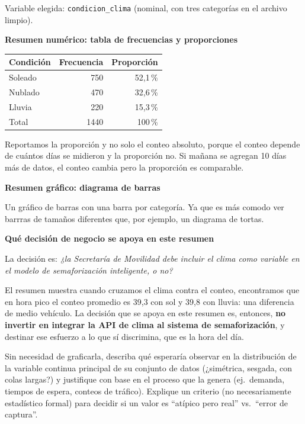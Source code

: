 \documentclass[11pt]{article}
\begin{document}
\begin{respuesta}[Respuesta 1.3]
Variable elegida: \texttt{condicion\_clima} (nominal, con tres categorías en el archivo limpio).

\medskip
\noindent\textbf{Resumen numérico: tabla de frecuencias y proporciones}

\begin{center}
\begin{tabular}{lrr}
\toprule
Condición & Frecuencia & Proporción \\
\midrule
Soleado & 750 & 52,1\,\% \\
Nublado & 470 & 32,6\,\% \\
Lluvia  & 220 & 15,3\,\% \\
\midrule
Total & 1440 & 100\,\% \\
\bottomrule
\end{tabular}
\end{center}

Reportamos la proporción y no solo el conteo absoluto, porque el conteo depende de cuántos días se midieron y la proporción no. Si mañana se agregan 10 días más de datos, el conteo cambia pero la proporción es comparable.

\medskip
\noindent\textbf{Resumen gráfico: diagrama de barras}

Un gráfico de barras con una barra por categoría. Ya que es más comodo ver barrras de tamaños diferentes que, por ejemplo, un diagrama de tortas.

\medskip
\noindent\textbf{Qué decisión de negocio se apoya en este resumen}

La decisión es: \emph{¿la Secretaría de Movilidad debe incluir el clima como variable en el modelo de semaforización inteligente, o no?}

El resumen muestra cuando cruzamos el clima contra el conteo, encontramos que en hora pico el conteo promedio es 39,3 con sol y 39,8 con lluvia: una diferencia de medio vehículo. La decisión que se apoya en este resumen es, entonces, \textbf{no invertir en integrar la API de clima al sistema de semaforización}, y destinar ese esfuerzo a lo que sí discrimina, que es la hora del día.
\end{respuesta}


\begin{pregunta}
Sin necesidad de graficarla, describa qué esperaría observar en la distribución de la variable continua principal de su conjunto de datos (¿simétrica, sesgada, con colas largas?) y justifique con base en el proceso que la genera (ej.\ demanda, tiempos de espera, conteos de tráfico). Explique un criterio (no necesariamente estadístico formal) para decidir si un valor es ``atípico pero real'' vs.\ ``error de captura''.
\end{pregunta}
\end{document}
